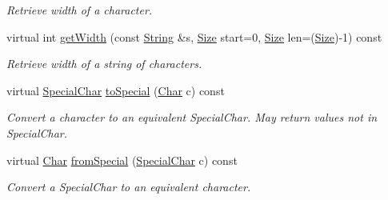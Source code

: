 \begin{DoxyCompactItemize}
\begin{DoxyCompactList}\small\item\em Retrieve width of a character. \end{DoxyCompactList}\item 
virtual int \hyperlink{classGUI_1_1Font_ac75c6c35f9ad90779e346c0d3bbb0db2}{get\-Width} (const \hyperlink{classGUI_1_1String}{String} \&s, \hyperlink{namespaceGUI_a10b6232e08729baa0bd211a86a69ce36}{Size} start=0, \hyperlink{namespaceGUI_a10b6232e08729baa0bd211a86a69ce36}{Size} len=(\hyperlink{namespaceGUI_a10b6232e08729baa0bd211a86a69ce36}{Size})-\/1) const 
\begin{DoxyCompactList}\small\item\em Retrieve width of a string of characters. \end{DoxyCompactList}\item 
\hypertarget{classGUI_1_1Font_ab574797e06559b8c69b1cf02878eee80}{virtual \hyperlink{classGUI_1_1Font_af3c234cd3febe27dbe9c76e6cc5cad3a}{Special\-Char} \hyperlink{classGUI_1_1Font_ab574797e06559b8c69b1cf02878eee80}{to\-Special} (\hyperlink{namespaceGUI_af6b04b46d40197b4f00e553d7d1a3e4c}{Char} c) const }\label{classGUI_1_1Font_ab574797e06559b8c69b1cf02878eee80}

\begin{DoxyCompactList}\small\item\em Convert a character to an equivalent Special\-Char. May return values not in Special\-Char. \end{DoxyCompactList}\item 
\hypertarget{classGUI_1_1Font_a202180fd7d82ab4ada066526776432d7}{virtual \hyperlink{namespaceGUI_af6b04b46d40197b4f00e553d7d1a3e4c}{Char} \hyperlink{classGUI_1_1Font_a202180fd7d82ab4ada066526776432d7}{from\-Special} (\hyperlink{classGUI_1_1Font_af3c234cd3febe27dbe9c76e6cc5cad3a}{Special\-Char} c) const }\label{classGUI_1_1Font_a202180fd7d82ab4ada066526776432d7}

\begin{DoxyCompactList}\small\item\em Convert a Special\-Char to an equivalent character. \end{DoxyCompactList}\end{DoxyCompactItemize}

